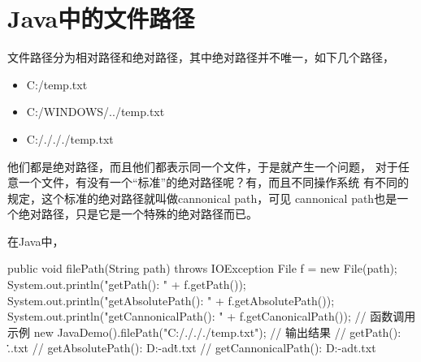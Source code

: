 \section[Java file path]{Java中的文件路径}
文件路径分为相对路径和绝对路径，其中绝对路径并不唯一，如下几个路径，
\begin{itemize}
  \item C:/temp.txt
  \item C:/WINDOWS/../temp.txt
  \item C:/./././temp.txt
\end{itemize}
他们都是绝对路径，而且他们都表示同一个文件，于是就产生一个问题，
对于任意一个文件，有没有一个“标准”的绝对路径呢？有，而且不同操作系统
有不同的规定，这个标准的绝对路径就叫做cannonical path，可见
cannonical path也是一个绝对路径，只是它是一个特殊的绝对路径而已。

在Java中，

\begin{javacode}
public void filePath(String path) throws IOException {
  File f = new File(path);
  System.out.println("getPath(): " + f.getPath());
  System.out.println("getAbsolutePath(): " + f.getAbsolutePath());
  System.out.println("getCannonicalPath(): " + f.getCanonicalPath());
}
// 函数调用示例
new JavaDemo().filePath("C:/./././temp.txt");
// 输出结果
// getPath(): .\.\.\temp.txt
// getAbsolutePath(): D:\eclipse\workspace-adt\JavaDemo\.\.\.\temp.txt
// getCannonicalPath(): D:\eclipse\workspace-adt\JavaDemo\temp.txt
\end{javacode}
